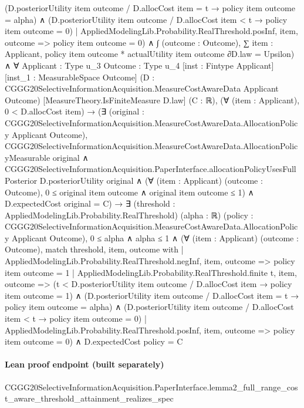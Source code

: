 \documentclass[10pt]{article}
\begin{document}
\begin{ReviewVerbatim}
                            (D.posteriorUtility item outcome / D.allocCost item = t → policy item outcome = alpha) ∧
                              (D.posteriorUtility item outcome / D.allocCost item < t → policy item outcome = 0)
                        | AppliedModelingLib.Probability.RealThreshold.posInf, item, outcome =>
                          policy item outcome = 0) ∧
                      ∫ (outcome : Outcome),
                          ∑ item : Applicant, policy item outcome * actualUtility item outcome ∂D.law =
                        Upsilon) ∧
  ∀ {Applicant : Type u_3} {Outcome : Type u_4} [inst : Fintype Applicant] [inst_1 : MeasurableSpace Outcome]
    (D : CGGG20SelectiveInformationAcquisition.MeasureCostAwareData Applicant Outcome)
    [MeasureTheory.IsFiniteMeasure D.law] (C : ℝ),
    (∀ (item : Applicant), 0 < D.allocCost item) →
      (∃ (original : CGGG20SelectiveInformationAcquisition.MeasureCostAwareData.AllocationPolicy Applicant Outcome),
          CGGG20SelectiveInformationAcquisition.MeasureCostAwareData.AllocationPolicyMeasurable original ∧
            CGGG20SelectiveInformationAcquisition.PaperInterface.allocationPolicyUsesFullPosterior D.posteriorUtility
                original ∧
              (∀ (item : Applicant) (outcome : Outcome), 0 ≤ original item outcome ∧ original item outcome ≤ 1) ∧
                D.expectedCost original = C) →
        ∃ (threshold : AppliedModelingLib.Probability.RealThreshold) (alpha : ℝ) (policy :
          CGGG20SelectiveInformationAcquisition.MeasureCostAwareData.AllocationPolicy Applicant Outcome),
          0 ≤ alpha ∧
            alpha ≤ 1 ∧
              (∀ (item : Applicant) (outcome : Outcome),
                  match threshold, item, outcome with
                  | AppliedModelingLib.Probability.RealThreshold.negInf, item, outcome => policy item outcome = 1
                  | AppliedModelingLib.Probability.RealThreshold.finite t, item, outcome =>
                    (t < D.posteriorUtility item outcome / D.allocCost item → policy item outcome = 1) ∧
                      (D.posteriorUtility item outcome / D.allocCost item = t → policy item outcome = alpha) ∧
                        (D.posteriorUtility item outcome / D.allocCost item < t → policy item outcome = 0)
                  | AppliedModelingLib.Probability.RealThreshold.posInf, item, outcome => policy item outcome = 0) ∧
                D.expectedCost policy = C
\end{ReviewVerbatim}

\paragraph{Lean proof endpoint (built separately)}\begin{ReviewVerbatim}
CGGG20SelectiveInformationAcquisition.PaperInterface.lemma2_full_range_cost_aware_threshold_attainment_realizes_spec
\end{ReviewVerbatim}
\end{document}
